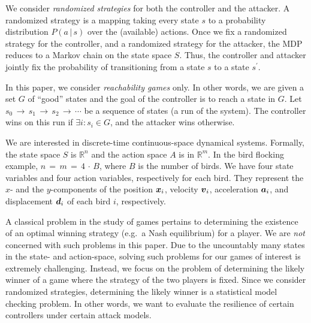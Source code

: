 We consider {\em{randomized strategies}} for both the controller and the attacker. A randomized strategy is a mapping taking every state $s$ to a probability distribution $P(a\,{|}\,s)$ over the (available) actions. 
Once we fix a randomized strategy for the controller, and a randomized strategy for the attacker, the MDP reduces to a Markov chain on the state space $S$. Thus, 
the controller and attacker jointly fix the probability of transitioning from a state $s$ to a state $s^\prime$. 

In this paper, we consider {\em{reachability games}} only. In other words, we are given a set $G$ of ``good'' states and the goal of the controller is to reach a state in $G$. Let $s_0\,{\rightarrow}\,s_1\,{\rightarrow}\,s_2\,{\rightarrow}\,\cdots$ be a sequence of states (a run of the system). The controller wins on this run if $\exists{i}: s_i \in G$, and the attacker wins otherwise.

We are interested in discrete-time continuous-space dynamical systems.  Formally, the state space $S$ is $\mathbb{R}^n$ and the action space $A$ is in $\mathbb{R}^m$. In the bird flocking example, $n\,{=}\,m\,{=}\,4\,{\cdot}\,B$, where $B$ is the number of birds. We have four state variables and four action variables, respectively for each bird. They represent the $x$- and the $y$-components of the position ${\boldsymbol {x}}_i$, velocity ${\boldsymbol {v}}_i$, acceleration ${\boldsymbol {a}}_i$, and displacement ${\boldsymbol {d}}_i$ of each bird $i$, respectively.

A classical problem in the study of games pertains to determining the existence of an optimal winning strategy (e.g.~a Nash equilibrium) for a player.  We are {\em{not}} concerned with such problems in this paper.  Due to the uncountably many states in the state- and action-space, solving such problems for our games of interest is extremely challenging. Instead, we focus on the problem of determining the likely winner of a game where the strategy of the two players is fixed.  Since we consider randomized strategies, determining the likely winner is a statistical model checking problem.  In other words, we want to evaluate the resilience of certain controllers under certain attack models.


